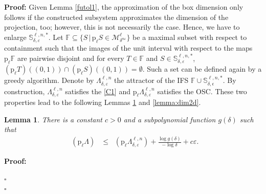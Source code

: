 \documentclass[a4paper, 11pt]{article}
\newenvironment{Proof}{\noindent \textbf{Proof:}}{\hfill$\square$\\}
\DeclareMathOperator{\dB}{\dim_{\mathrm{B}}}
\numberwithin{equation}{section}
\theoremstyle{plain}
\newtheorem{lemma}[theorem]{Lemma}
\theoremstyle{remark}
\theoremstyle{definition}
\begin{document}
\begin{Proof}
Given Lemma \ref{futol1}, the approximation of the box dimension only follows if the constructed subsystem approximates the dimension of the projection, too; however, this is not necessarily the case. Hence, we have to enlarge $\mathbb{S}_{\delta, \varepsilon}^{\ell, n, *}$. Let $\mathbb{F} \subseteq \{S \, |\, \mathrm{p}_\ell S \in \mathcal{M}_{\delta^{n\varepsilon}}^{\ell}\}$ be a maximal subset with respect to containment such that the images of the unit interval with respect to the maps $\mathrm{p}_\ell\mathbb{F}$ are pairwise disjoint and for every $T\in\mathbb{F}$ and $S\in\mathbb{S}_{\delta, \varepsilon}^{\ell, n, *}$, $(\mathrm{p}_\ell T)((0,1))\cap(\mathrm{p}_\ell S)((0,1))=\emptyset$. Such a set can be defined again by a greedy algorithm. Denote by $\Lambda_{\delta,\varepsilon}^{\ell,n}$ the attractor of the IFS $\mathbb{F} \cup \mathbb{S}_{\delta,\epsilon}^{\ell,n,*}$. By construction, $\Lambda_{\delta,\varepsilon}^{\ell,n}$ satisfies the \ref{C1} and $\mathrm{p}_\ell \Lambda_{\delta,\varepsilon}^{\ell,n}$ satisfies the OSC. These two properties lead to the following Lemmas \ref{lemma:dimproj} and \ref{lemma:dim2d}.

\begin{lemma}\label{lemma:dimproj} There is a constant $c> 0$ and a subpolynomial function $g(\delta)$ such that 
\begin{align*}
\dB(\mathrm{p}_\ell\Lambda) &\leq \dB(\mathrm{p}_\ell \Lambda_{\delta,\varepsilon}^{\ell,n}) + \frac{\log g(\delta)}{-\log\delta}+ c\varepsilon.
\end{align*}
\end{lemma}
\begin{Proof}


\end{Proof}
\end{Proof}
\end{document}
